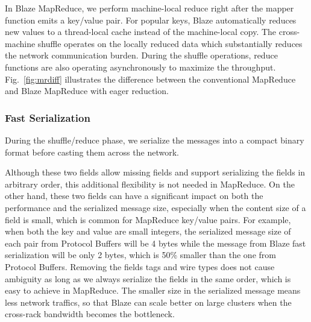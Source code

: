 In Blaze MapReduce, we perform machine-local reduce right after the mapper function emits a key/value pair.
For popular keys, Blaze automatically reduces new values to a thread-local cache instead of the machine-local copy.
The cross-machine shuffle operates on the locally reduced data which substantially reduces the network communication burden.
During the shuffle operations, reduce functions are also operating asynchronously to maximize the throughput.
Fig.~\ref{fig:mrdiff} illustrates the difference between the conventional MapReduce and Blaze MapReduce with eager reduction.

\subsubsection{Fast Serialization}
During the shuffle/reduce phase, we serialize the messages into a compact binary format before casting them across the network.

Although these two fields allow missing fields and support serializing the fields in arbitrary order, this additional flexibility is not needed in MapReduce.
On the other hand, these two fields can have a significant impact on both the performance and the serialized message size, especially when the content size of a field is small, which is common for MapReduce key/value pairs.
For example, when both the key and value are small integers, the serialized message size of each pair from Protocol Buffers will be 4 bytes while the message from Blaze fast serialization will be only 2 bytes, which is 50\% smaller than the one from Protocol Buffers.
Removing the fields tags and wire types does not cause ambiguity as long as we always serialize the fields in the same order, which is easy to achieve in MapReduce.
The smaller size in the serialized message means less network traffics, so that Blaze can scale better on large clusters when the cross-rack bandwidth becomes the bottleneck.




